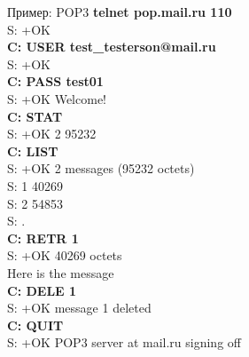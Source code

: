 \begin{frame}[fragile]{Пример: POP3}
\scriptsize
	{\bfseries telnet pop.mail.ru 110}\\
	S: +OK\\
	{\bfseries C: USER test\_testerson@mail.ru}\\
	S: +OK\\
	{\bfseries C: PASS test01}\\
	S: +OK Welcome!\\
	{\bfseries C: STAT}\\
	S: +OK 2 95232\\
	{\bfseries C: LIST}\\
	S: +OK 2 messages (95232 octets)\\
	S: 1 40269\\
	S: 2 54853\\
	S: .\\
	{\bfseries C: RETR 1}\\
	S: +OK 40269 octets\\
	{\color{gray}  Here is the message}\\
	{\bfseries C: DELE 1}\\
	S: +OK message 1 deleted\\
	{\bfseries C: QUIT}\\
	S: +OK POP3 server at mail.ru signing off\\
\normalsize
\end{frame}


